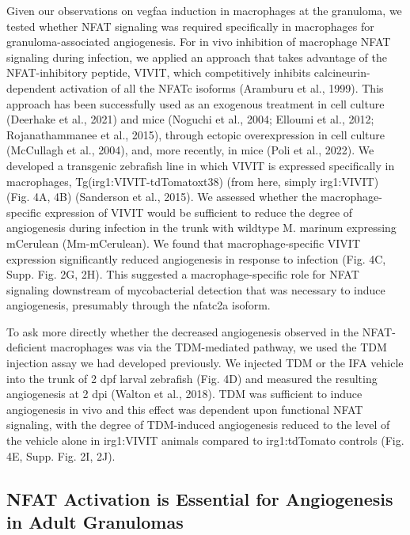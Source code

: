 Given our observations on vegfaa induction in macrophages at the granuloma, we tested whether NFAT signaling was required specifically in macrophages for granuloma-associated angiogenesis. For in vivo inhibition of macrophage NFAT signaling during infection, we applied an approach that takes advantage of the NFAT-inhibitory peptide, VIVIT, which competitively inhibits calcineurin-dependent activation of all the NFATc isoforms (Aramburu et al., 1999). This approach has been successfully used as an exogenous treatment in cell culture (Deerhake et al., 2021) and mice (Noguchi et al., 2004; Elloumi et al., 2012; Rojanathammanee et al., 2015), through ectopic overexpression in cell culture (McCullagh et al., 2004),  and, more recently, in mice (Poli et al., 2022). We developed a transgenic zebrafish line in which VIVIT is expressed specifically in macrophages, Tg(irg1:VIVIT-tdTomatoxt38) (from here, simply irg1:VIVIT) (Fig. 4A, 4B) (Sanderson et al., 2015). We assessed whether the macrophage-specific expression of VIVIT would be sufficient to reduce the degree of angiogenesis during infection in the trunk with wildtype M. marinum expressing mCerulean (Mm-mCerulean). We found that macrophage-specific VIVIT expression significantly reduced angiogenesis in response to infection (Fig. 4C, Supp. Fig. 2G, 2H). This suggested a macrophage-specific role for NFAT signaling downstream of mycobacterial detection that was necessary to induce angiogenesis, presumably through the nfatc2a isoform.

To ask more directly whether the decreased angiogenesis observed in the NFAT-deficient macrophages was via the TDM-mediated pathway, we used the TDM injection assay we had developed previously. We injected TDM or the IFA vehicle  into the trunk of 2 dpf larval zebrafish (Fig. 4D) and measured the resulting angiogenesis at 2 dpi (Walton et al., 2018). TDM was sufficient to induce angiogenesis in vivo and this effect was dependent upon functional NFAT signaling, with the degree of TDM-induced angiogenesis reduced to the level of the vehicle alone in irg1:VIVIT animals compared to irg1:tdTomato controls (Fig. 4E, Supp. Fig. 2I, 2J).

\subsection{NFAT Activation is Essential for Angiogenesis in Adult Granulomas}

